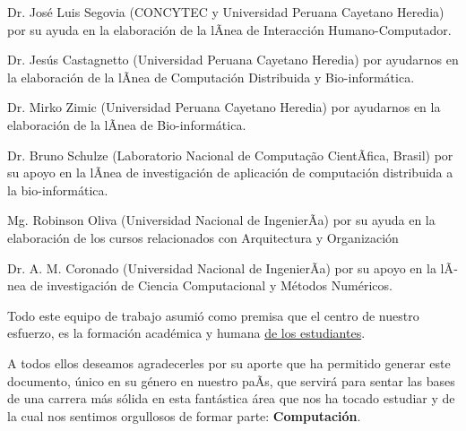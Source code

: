 \begin{itemize}
{\item Dr. José Luis Segovia (CONCYTEC y Universidad Peruana Cayetano Heredia) por su ayuda en la elaboración de la lÃ­nea de Interacción Humano-Computador.

\item Dr. Jes\'us Castagnetto (Universidad Peruana Cayetano Heredia) por ayudarnos en la elaboración de la lÃ­nea de Computación Distribuida y Bio-informática.

\item Dr. Mirko Zimic (Universidad Peruana Cayetano Heredia) por ayudarnos en la elaboración de la lÃ­nea de Bio-informática.

\item Dr. Bruno Schulze (Laboratorio Nacional de Computa\c{c}\~ao CientÃ­fica, Brasil) por su apoyo en la lÃ­nea de investigación de aplicación de computación distribuida a la bio-informática.

\item Mg. Robinson Oliva (Universidad Nacional de IngenierÃ­a) por su ayuda en la elaboración de los cursos relacionados con Arquitectura y Organización

\item Dr. A. M. Coronado (Universidad Nacional de IngenierÃ­a) por su apoyo en la lÃ­nea de investigación de Ciencia Computacional y Métodos Numéricos.
}
\end{itemize}



Todo este equipo de trabajo asumió como premisa que el centro de nuestro esfuerzo, 
es la formación académica y humana \underline{de los estudiantes}.

A todos ellos deseamos agradecerles por su aporte que ha permitido generar 
este documento, único en su género en nuestro paÃ­s, que servirá para sentar las 
bases de una carrera más sólida en esta fantástica área que nos ha tocado estudiar y 
de la cual nos sentimos orgullosos de formar parte: \textbf{Computación}.
